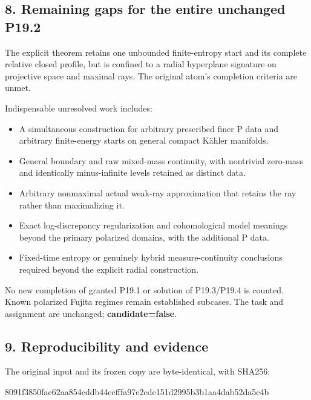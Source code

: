 \documentclass[
  11pt,
]{article}
\newenvironment{Shaded}{}{}
\newcommand{\NormalTok}[1]{#1}
\providecommand{\tightlist}{%
  \setlength{\itemsep}{0pt}\setlength{\parskip}{0pt}}
\begin{document}
\subsection{8. Remaining gaps for the entire unchanged
P19.2}\label{remaining-gaps-for-the-entire-unchanged-p19.2}

The explicit theorem retains one unbounded finite-entropy start and its
complete relative closed profile, but is confined to a radial hyperplane
signature on projective space and maximal rays. The original atom's
completion criteria are unmet.

Indispensable unresolved work includes:

\begin{itemize}
\tightlist
\item
  A simultaneous construction for arbitrary prescribed finer P data and
  arbitrary finite-energy starts on general compact Kähler manifolds.
\item
  General boundary and raw mixed-mass continuity, with nontrivial
  zero-mass and identically minus-infinite levels retained as distinct
  data.
\item
  Arbitrary nonmaximal actual weak-ray approximation that retains the
  ray rather than maximalizing it.
\item
  Exact log-discrepancy regularization and cohomological model meanings
  beyond the primary polarized domains, with the additional P data.
\item
  Fixed-time entropy or genuinely hybrid measure-continuity conclusions
  required beyond the explicit radial construction.
\end{itemize}

No new completion of granted P19.1 or solution of P19.3/P19.4 is
counted. Known polarized Fujita regimes remain established subcases. The
task and assignment are unchanged; \textbf{candidate=false}.

\subsection{9. Reproducibility and
evidence}\label{reproducibility-and-evidence}

The original input and its frozen copy are byte-identical, with SHA256:

\begin{Shaded}
\begin{Highlighting}[]
\NormalTok{8091f3850fac62aa854cddb44ccfffa97e2cde151d2995b3b1aa4dab52da5c4b}
\end{Highlighting}
\end{Shaded}
\end{document}
